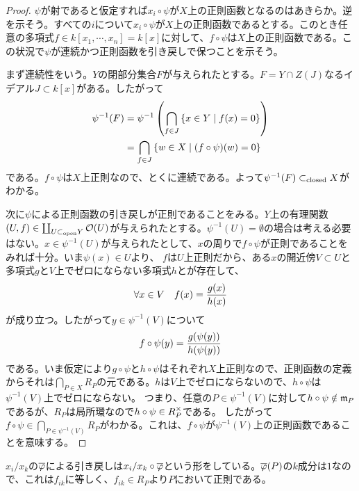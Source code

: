   \begin{proof}
    $\psi$が射であると仮定すれば$x_i \circ \psi $が$X$上の正則函数となるのはあきらか。逆を示そう。すべての$i$について$x_i \circ \psi $が$X$上の正則函数であるとする。このとき任意の多項式$f \in k[x_1, \cdots ,x_n] = k[x]$に対して、$f \circ \psi$は$X$上の正則函数である。この状況で$\psi$が連続かつ正則函数を引き戻しで保つことを示そう。

    まず連続性をいう。$Y$の閉部分集合$F$が与えられたとする。$F =Y \cap  Z(J)$なるイデアル$J \subset k[x]$がある。したがって
    \begin{align*}
      \psi^{-1}(F) &= \psi^{-1}\left( \bigcap_{f \in J} \left\{ x \in Y \mathrel{} \middle| \mathrel{} f(x) = 0 \right\} \right) \\
      &= \bigcap_{f \in J} \left\{ w \in X \mathrel{} \middle| \mathrel{} (f \circ \psi)(w) = 0 \right\}
    \end{align*}
    である。$f \circ \psi$は$X$上正則なので、とくに連続である。よって$\psi^{-1}(F) \subset_{\text{closed}} X$がわかる。

    次に$\psi$による正則函数の引き戻しが正則であることをみる。$Y$上の有理関数$(U,f) \in \coprod_{U \subset_{\text{open}} Y} \mathcal{O}(U)$が与えられたとする。$\psi^{-1}(U) = \emptyset$の場合は考える必要はない。$x \in \psi^{-1}(U)$が与えられたとして、$x $の周りで$f \circ \psi$が正則であることをみれば十分。いま$\psi(x) \in U$より、
    $f$は$U$上正則だから、ある$x$の開近傍$V \subset U$と多項式$g$と$V$上でゼロにならない多項式$h$とが存在して、
    \[
    \forall x \in V \quad f(x) = \frac{g(x)}{h(x)}
    \]
    が成り立つ。したがって$y \in \psi^{-1}(V)$について
    \[
    f \circ \psi (y) = \frac{g(\psi(y))}{h(\psi(y))}
    \]
    である。いま仮定により$g \circ \psi$と$h \circ \psi$はそれぞれ$X$上正則なので、正則函数の定義からそれは$\bigcap_{P \in X} R_P$の元である。$h$は$V$上でゼロにならないので、$h \circ \psi$は$\psi^{-1}(V)$上でゼロにならない。
    つまり、任意の$P \in \psi^{-1}(V)$に対して$h \circ \psi \notin \mathfrak{m}_P$であるが、$R_P$は局所環なので$h \circ \psi \in R_P^{\times}$である。
    したがって$f \circ \psi \in \bigcap_{P \in \psi^{-1}(V)} R_P$がわかる。これは、$f \circ \psi$が$\psi^{-1}(V)$上の正則函数であることを意味する。
  \end{proof}




\begin{rem}
$x_i/x_k$の$\overline{{\varphi}}$による引き戻しは$x_i/ x_k \circ \overline{{\varphi}}$という形をしている。$\overline{{\varphi}}(P)$の$k$成分は$1$なので、これは$f_{ik}$に等しく、$f_{ik} \in R_P$より$P$において正則である。    
\end{rem}
